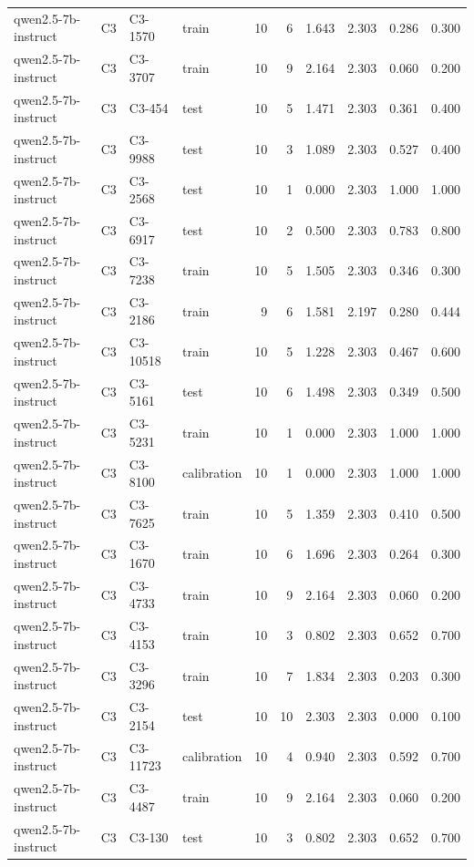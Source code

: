 \begin{table}
\begin{tabular}{llllrrrrrr}
qwen2.5-7b-instruct & C3 & C3-1570 & train & 10 & 6 & 1.643 & 2.303 & 0.286 & 0.300 \\
qwen2.5-7b-instruct & C3 & C3-3707 & train & 10 & 9 & 2.164 & 2.303 & 0.060 & 0.200 \\
qwen2.5-7b-instruct & C3 & C3-454 & test & 10 & 5 & 1.471 & 2.303 & 0.361 & 0.400 \\
qwen2.5-7b-instruct & C3 & C3-9988 & test & 10 & 3 & 1.089 & 2.303 & 0.527 & 0.400 \\
qwen2.5-7b-instruct & C3 & C3-2568 & test & 10 & 1 & 0.000 & 2.303 & 1.000 & 1.000 \\
qwen2.5-7b-instruct & C3 & C3-6917 & test & 10 & 2 & 0.500 & 2.303 & 0.783 & 0.800 \\
qwen2.5-7b-instruct & C3 & C3-7238 & train & 10 & 5 & 1.505 & 2.303 & 0.346 & 0.300 \\
qwen2.5-7b-instruct & C3 & C3-2186 & train & 9 & 6 & 1.581 & 2.197 & 0.280 & 0.444 \\
qwen2.5-7b-instruct & C3 & C3-10518 & train & 10 & 5 & 1.228 & 2.303 & 0.467 & 0.600 \\
qwen2.5-7b-instruct & C3 & C3-5161 & test & 10 & 6 & 1.498 & 2.303 & 0.349 & 0.500 \\
qwen2.5-7b-instruct & C3 & C3-5231 & train & 10 & 1 & 0.000 & 2.303 & 1.000 & 1.000 \\
qwen2.5-7b-instruct & C3 & C3-8100 & calibration & 10 & 1 & 0.000 & 2.303 & 1.000 & 1.000 \\
qwen2.5-7b-instruct & C3 & C3-7625 & train & 10 & 5 & 1.359 & 2.303 & 0.410 & 0.500 \\
qwen2.5-7b-instruct & C3 & C3-1670 & train & 10 & 6 & 1.696 & 2.303 & 0.264 & 0.300 \\
qwen2.5-7b-instruct & C3 & C3-4733 & train & 10 & 9 & 2.164 & 2.303 & 0.060 & 0.200 \\
qwen2.5-7b-instruct & C3 & C3-4153 & train & 10 & 3 & 0.802 & 2.303 & 0.652 & 0.700 \\
qwen2.5-7b-instruct & C3 & C3-3296 & train & 10 & 7 & 1.834 & 2.303 & 0.203 & 0.300 \\
qwen2.5-7b-instruct & C3 & C3-2154 & test & 10 & 10 & 2.303 & 2.303 & 0.000 & 0.100 \\
qwen2.5-7b-instruct & C3 & C3-11723 & calibration & 10 & 4 & 0.940 & 2.303 & 0.592 & 0.700 \\
qwen2.5-7b-instruct & C3 & C3-4487 & train & 10 & 9 & 2.164 & 2.303 & 0.060 & 0.200 \\
qwen2.5-7b-instruct & C3 & C3-130 & test & 10 & 3 & 0.802 & 2.303 & 0.652 & 0.700 \\

\end{tabular}
\end{table}
